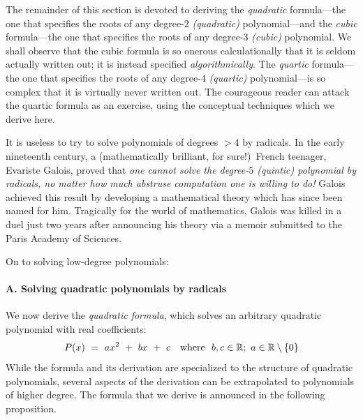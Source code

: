   
  

\medskip

The remainder of this section is devoted to deriving the {\em quadratic} formula---the one that specifies the roots of any degree-$2$ {\it (quadratic)}  polynomial---and the {\em cubic} formula---the one that specifies the roots of any degree-$3$ {\it (cubic)} polynomial.  We shall observe that the cubic formula is so onerous calculationally that it is seldom actually written out; it is instead specified {\em algorithmically}.  The {\em quartic} formula---the one that specifies the roots of any degree-$4$ {\it (quartic)}  polynomial---is so complex that it is virtually never written out.  The courageous reader can attack the quartic formula as an exercise, using the conceptual techniques which we derive here.

   

\smallskip

It is useless to try to solve polynomials of degrees $> 4$ by radicals.  In the early nineteenth century, a (mathematically brilliant, for sure!)~French teenager, Evariste Galois, proved that {\em one cannot solve the degree-$5$ {\it (quintic)} polynomial by radicals, no matter how much abstruse computation one is willing to do!}  Galois achieved this result by developing a mathematical theory which has since been named for him.  Tragically for the world of mathematics, Galois was killed in a duel just two years after announcing his theory via a memoir submitted to the Paris Academy of Sciences.

\medskip

\noindent
On to solving low-degree polynomials:

\paragraph{A. Solving quadratic polynomials by radicals}

 
We now derive the {\it quadratic formula}, which solves an arbitrary quadratic polynomial with real coefficients:  
\begin{equation}
\label{eq:generic-quadratic-1}
P(x) \ = \  ax^2 \ + \ bx \ + \ c \ \ \mbox{  where  } \ b,c \in \mathbb{R};
\ a \in \mathbb{R} \setminus \{0\}
\end{equation}
While the formula and its derivation are specialized to the structure of quadratic polynomials, several aspects of the derivation can be extrapolated to polynomials of higher degree.  The formula that we derive is announced in the following proposition.  

